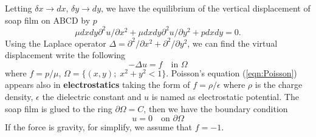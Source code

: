 \documentclass[a4paper,twoside,12pt]{book}
\def\p{\partial}
\begin{document}
Letting $\delta x\to dx,\, \delta y\to dy$, we have the equilibrium of the vertical displacement of soap film on ABCD by $p$
\[
\mu dx dy\p^2 u/\p x^2 +  \mu dx dy\p^2 u/\p y^2
+ p dx dy = 0.
\]
Using the Laplace operator $\Delta = \p^2 /\p x^2 + \p^2 /\p y^2$, we can find the virtual displacement write the following
\begin{equation}
-\Delta u = f\quad \mbox{in }\Omega
\end{equation}%
where $f=p/\mu$, $\Omega =\{(x,y);\;x^{2}+y^{2}<1\}$.
 Poisson's equation (\ref{eqn:Poisson}) appears
also in \textbf{electrostatics} taking the form of $f=\rho /\epsilon $ where
$\rho $ is the charge density, $\epsilon $ the dielectric constant and $u$
is named as electrostatic potential. The soap film is glued to the ring $%
\p \Omega =C$, then we have the boundary condition
\begin{equation}
u=0\quad \mbox{on }\p \Omega
\end{equation}%
If the force is gravity, for simplify, we assume that $f=-1$.
\end{document}
